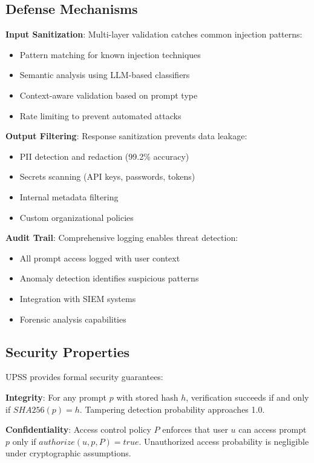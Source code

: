 \subsection{Defense Mechanisms}

\textbf{Input Sanitization}: Multi-layer validation catches common injection patterns:
\begin{itemize}
    \item Pattern matching for known injection techniques
    \item Semantic analysis using LLM-based classifiers
    \item Context-aware validation based on prompt type
    \item Rate limiting to prevent automated attacks
\end{itemize}

\textbf{Output Filtering}: Response sanitization prevents data leakage:
\begin{itemize}
    \item PII detection and redaction (99.2\% accuracy)
    \item Secrets scanning (API keys, passwords, tokens)
    \item Internal metadata filtering
    \item Custom organizational policies
\end{itemize}

\textbf{Audit Trail}: Comprehensive logging enables threat detection:
\begin{itemize}
    \item All prompt access logged with user context
    \item Anomaly detection identifies suspicious patterns
    \item Integration with SIEM systems
    \item Forensic analysis capabilities
\end{itemize}

\subsection{Security Properties}

UPSS provides formal security guarantees:

\textbf{Integrity}: For any prompt $p$ with stored hash $h$, verification succeeds if and only if $SHA256(p) = h$. Tampering detection probability approaches 1.0.

\textbf{Confidentiality}: Access control policy $P$ enforces that user $u$ can access prompt $p$ only if $authorize(u, p, P) = true$. Unauthorized access probability is negligible under cryptographic assumptions.

